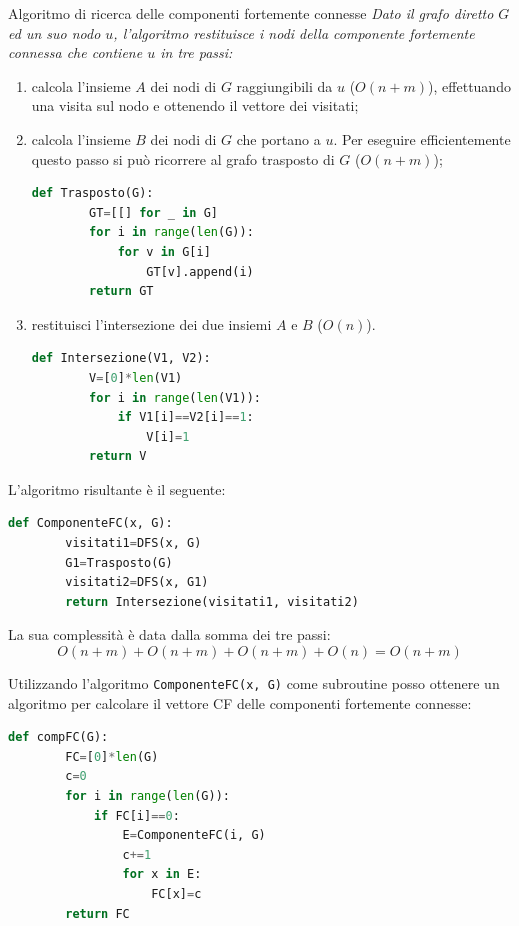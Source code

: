 \begin{Algoritmo}{Algoritmo di ricerca delle componenti fortemente connesse}{}
    \textit{Dato il grafo diretto $G$ ed un suo nodo $u$, l'algoritmo restituisce i nodi della componente fortemente connessa che contiene $u$ in tre passi:}
    \begin{enumerate}
        \item calcola l'insieme $A$ dei nodi di $G$ raggiungibili da $u$ ($O(n+m)$), effettuando una visita sul nodo e ottenendo il vettore dei visitati;
        \item calcola l'insieme $B$ dei nodi di $G$ che portano a $u$. Per eseguire efficientemente questo passo si può ricorrere al grafo trasposto di $G$ ($O(n+m)$);
        \begin{lstlisting}[language=Python]
    def Trasposto(G):
        GT=[[] for _ in G]
        for i in range(len(G)):
            for v in G[i]
                GT[v].append(i)
        return GT
        \end{lstlisting}
        \item restituisci l'intersezione dei due insiemi $A$ e $B$ ($O(n)$).
        \begin{lstlisting}[language=Python]
    def Intersezione(V1, V2):
        V=[0]*len(V1)
        for i in range(len(V1)):
            if V1[i]==V2[i]==1:
                V[i]=1
        return V
        \end{lstlisting}
    \end{enumerate}

L'algoritmo risultante è il seguente:
 \begin{lstlisting}[language=Python]
    def ComponenteFC(x, G):
        visitati1=DFS(x, G)
        G1=Trasposto(G)
        visitati2=DFS(x, G1)
        return Intersezione(visitati1, visitati2)
\end{lstlisting}
    La sua complessità è data dalla somma dei tre passi:
    \begin{equation*}
        O(n+m)+O(n+m)+O(n+m)+O(n)=O(n+m)
    \end{equation*}
\end{Algoritmo}

Utilizzando l'algoritmo \verb|ComponenteFC(x, G)| come subroutine posso ottenere un algoritmo per calcolare il vettore CF delle componenti fortemente connesse:
\begin{lstlisting}[language=Python]
    def compFC(G):
        FC=[0]*len(G)
        c=0
        for i in range(len(G)):
            if FC[i]==0:
                E=ComponenteFC(i, G)
                c+=1
                for x in E:
                    FC[x]=c
        return FC
\end{lstlisting}

